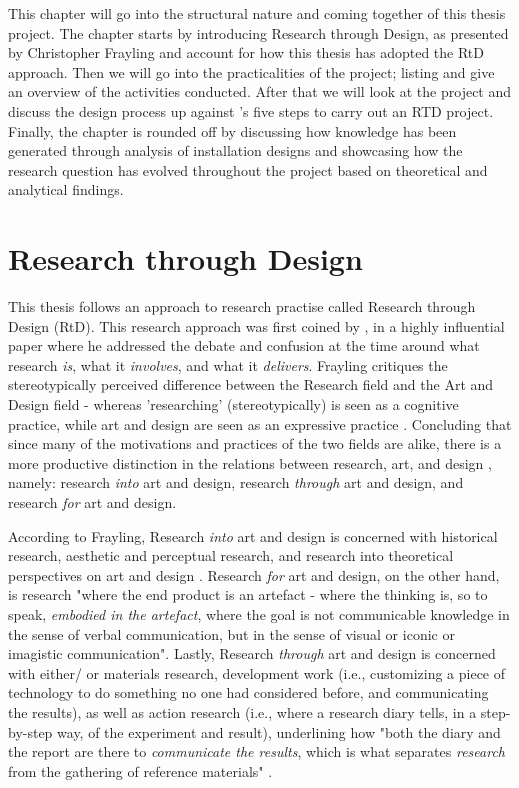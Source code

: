 This chapter will go into the structural nature and coming together of this thesis project. The chapter starts by introducing Research through Design, as presented by Christopher Frayling and account for how this thesis has adopted the RtD approach. Then we will go into the practicalities of the project; listing and give an overview of the activities conducted. After that we will look at the project and discuss the design process up against \autocite{zimmerman_research_2014}'s five steps to carry out an RTD project. Finally, the chapter is rounded off by discussing how knowledge has been generated through analysis of installation designs and showcasing how the research question has evolved throughout the project based on theoretical and analytical findings.

\section{Research through Design}
This thesis follows an approach to research practise called Research through Design (RtD). This research approach was first coined by \autocite{frayling_1994}, in a highly influential paper where he addressed the debate and confusion at the time around what research \emph{is}, what it \emph{involves}, and what it \emph{delivers}. Frayling critiques the stereotypically perceived difference between the Research field and the Art and Design field - whereas 'researching' (stereotypically) is seen as a cognitive practice, while art and design are seen as an expressive practice \autocite[p. 5]{frayling_1994}. Concluding that since many of the motivations and practices of the two fields are alike, there is a more productive distinction in the relations between research, art, and design \autocite[p. 5]{frayling_1994}, namely: research \emph{into} art and design, research \emph{through} art and design, and research \emph{for} art and design.

According to Frayling, Research \emph{into} art and design is concerned with historical research, aesthetic and perceptual research, and research into theoretical perspectives on art and design \autocite[p. 5]{frayling_1994}. Research \emph{for} art and design, on the other hand, is research "where the end product is an artefact - where the thinking is, so to speak, \emph{embodied in the artefact}, where the goal is not communicable knowledge in the sense of verbal communication, but in the sense of visual or iconic or imagistic communication"\autocite[p. 5]{frayling_1994}. Lastly, Research \emph{through} art and design is concerned with either/ or materials research, development work (i.e., customizing a piece of technology to do something no one had considered before, and communicating the results), as well as action research (i.e., where a research diary tells, in a step-by-step way, of the experiment and result), underlining how "both the diary and the report are there to \emph{communicate the results}, which is what separates \emph{research} from the gathering of reference materials" \autocite[p. 5]{frayling_1994}.

